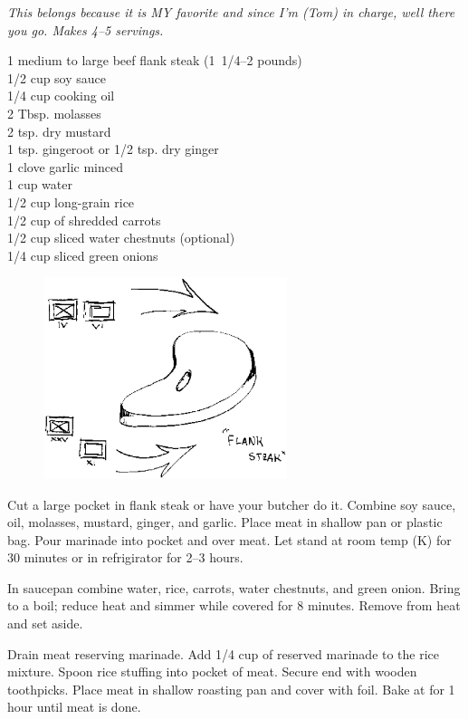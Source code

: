 \textit{This belongs because it is MY favorite and since I'm (Tom) 
in charge, well there you go.  Makes 4--5 servings.}
\begin{ingredients}
1 medium to large beef flank steak (1\ 1/4--2 pounds) \\
1/2 cup soy sauce \\
1/4 cup cooking oil \\
2 Tbsp. molasses \\
2 tsp. dry mustard \\
1 tsp. gingeroot or 1/2 tsp. dry ginger \\
1 clove garlic minced \\
1 cup water \\
1/2 cup long-grain rice \\
1/2 cup of shredded carrots \\
1/2 cup sliced water chestnuts (optional) \\
1/4 cup sliced green onions
\end{ingredients}
\begin{figure}
\centerline{\includegraphics[width=2.8in,clip]{flank.ps}}
\end{figure}
Cut a large pocket in flank steak or have your butcher do it.  Combine soy
sauce, oil, molasses, mustard, ginger, and garlic.  Place meat in shallow pan
or plastic bag.  Pour marinade into pocket and over meat. Let stand at room
temp (K) for 30 minutes or in refrigirator for 2--3 hours.

In saucepan combine water, rice, carrots, water chestnuts, and green onion. 
Bring to a boil; reduce heat and simmer while covered for 8 minutes.  Remove
from heat and set aside. 

Drain meat reserving marinade.  Add 1/4 cup of reserved marinade to the rice
mixture.  Spoon rice stuffing into pocket of meat.  Secure end with wooden
toothpicks.  Place meat in shallow roasting pan and cover with foil.  Bake at
 for 1 hour until meat is done.

